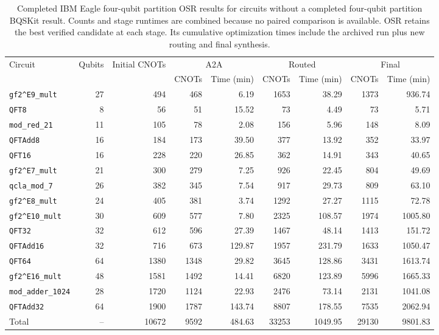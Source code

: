 \begin{table}[p]
\centering
\scriptsize
\begin{tabular}{lrr|rr|rr|rr}
\hline
Circuit & Qubits & Initial CNOTs & \multicolumn{2}{c|}{A2A} & \multicolumn{2}{c|}{Routed} & \multicolumn{2}{c}{Final} \\
 & & & CNOTs & Time (min) & CNOTs & Time (min) & CNOTs & Time (min) \\
\hline
\texttt{gf2\textasciicircum{}E9\_mult} & 27 & 494 & 468 & 6.19 & 1653 & 38.29 & 1373 & 936.74 \\
\texttt{QFT8} & 8 & 56 & 51 & 15.52 & 73 & 4.49 & 73 & 5.71 \\
\texttt{mod\_red\_21} & 11 & 105 & 78 & 2.08 & 156 & 5.96 & 148 & 8.09 \\
\texttt{QFTAdd8} & 16 & 184 & 173 & 39.50 & 377 & 13.92 & 352 & 33.97 \\
\texttt{QFT16} & 16 & 228 & 220 & 26.85 & 362 & 14.91 & 343 & 40.65 \\
\texttt{gf2\textasciicircum{}E7\_mult} & 21 & 300 & 279 & 7.25 & 926 & 22.45 & 804 & 49.69 \\
\texttt{qcla\_mod\_7} & 26 & 382 & 345 & 7.54 & 917 & 29.73 & 809 & 63.10 \\
\texttt{gf2\textasciicircum{}E8\_mult} & 24 & 405 & 381 & 3.74 & 1292 & 27.27 & 1115 & 72.78 \\
\texttt{gf2\textasciicircum{}E10\_mult} & 30 & 609 & 577 & 7.80 & 2325 & 108.57 & 1974 & 1005.80 \\
\texttt{QFT32} & 32 & 612 & 596 & 27.39 & 1467 & 48.14 & 1413 & 151.72 \\
\texttt{QFTAdd16} & 32 & 716 & 673 & 129.87 & 1957 & 231.79 & 1633 & 1050.47 \\
\texttt{QFT64} & 64 & 1380 & 1348 & 29.82 & 3645 & 128.86 & 3431 & 1613.74 \\
\texttt{gf2\textasciicircum{}E16\_mult} & 48 & 1581 & 1492 & 14.41 & 6820 & 123.89 & 5996 & 1665.33 \\
\texttt{mod\_adder\_1024} & 28 & 1720 & 1124 & 22.93 & 2476 & 73.14 & 2131 & 1041.08 \\
\texttt{QFTAdd32} & 64 & 1900 & 1787 & 143.74 & 8807 & 178.55 & 7535 & 2062.94 \\
\hline
Total & -- & 10672 & 9592 & 484.63 & 33253 & 1049.95 & 29130 & 9801.83 \\
\hline
\end{tabular}
\caption{Completed IBM Eagle four-qubit partition OSR results for circuits without a completed four-qubit partition BQSKit result. Counts and stage runtimes are combined because no paired comparison is available. OSR retains the best verified candidate at each stage. Its cumulative optimization times include the archived run plus new routing and final synthesis.}
\label{tab:osr-four-qubit-unpaired-ibm-eagle}
\end{table}

